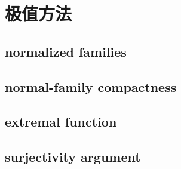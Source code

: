 \section{极值方法}
\label{b3:sec:0502}


\subsection{normalized families}
\label{b3:subsec:050201}

\subsection{normal-family compactness}
\label{b3:subsec:050202}

\subsection{extremal function}
\label{b3:subsec:050203}

\subsection{surjectivity argument}
\label{b3:subsec:050204}


